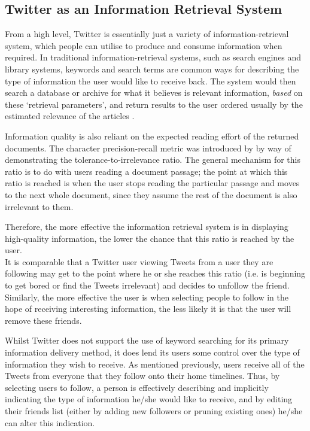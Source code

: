 \subsection{Twitter as an Information Retrieval System}
From a high level, Twitter is essentially just a variety of information-retrieval system, which people can utilise to produce and consume information when required. In traditional information-retrieval systems, such as search engines and library systems, keywords and search terms are common ways for describing the type of information the user would like to receive back. The system would then search a database or archive for what it believes is relevant information, \textit{based} on these `retrieval parameters', and return results to the user ordered usually by the estimated relevance of the articles \cite{arvola10}.

Information quality is also reliant on the expected reading effort of the returned documents. The character precision-recall metric was introduced by \cite{arvola10} by way of demonstrating the tolerance-to-irrelevance ratio. The general mechanism for this ratio is to do with users reading a document passage; the point at which this ratio is reached is when the user stops reading the particular passage and moves to the next whole document, since they assume the rest of the document is also irrelevant to them.

Therefore, the more effective the information retrieval system is in displaying high-quality information, the lower the chance that this ratio is reached by the user.\\ 
It is comparable that a Twitter user viewing Tweets from a user they are following may get to the point where he or she reaches this ratio (i.e. is beginning to get bored or find the Tweets irrelevant) and decides to unfollow the friend. Similarly, the more effective the user is when selecting people to follow in the hope of receiving interesting information, the less likely it is that the user will remove these friends.

Whilst Twitter does not support the use of keyword searching for its primary information delivery method, it does lend its users some control over the type of information they wish to receive. As mentioned previously, users receive all of the Tweets from everyone that they follow onto their home timelines. Thus, by selecting users to follow, a person is effectively describing and implicitly indicating the type of information he/she would like to receive, and by editing their friends list (either by adding new followers or pruning existing ones) he/she can alter this indication.

